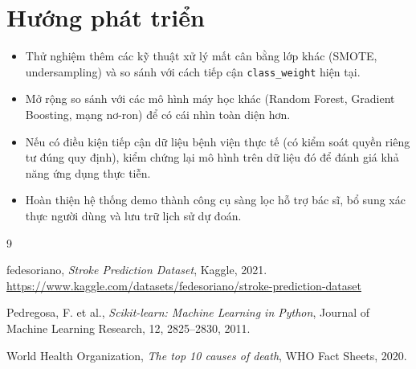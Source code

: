 \documentclass[12pt,a4paper]{report}
\begin{document}
\section{Hướng phát triển}

\begin{itemize}
    \item Thử nghiệm thêm các kỹ thuật xử lý mất cân bằng lớp khác (SMOTE, undersampling) và so sánh với cách tiếp cận \texttt{class\_weight} hiện tại.
    \item Mở rộng so sánh với các mô hình máy học khác (Random Forest, Gradient Boosting, mạng nơ-ron) để có cái nhìn toàn diện hơn.
    \item Nếu có điều kiện tiếp cận dữ liệu bệnh viện thực tế (có kiểm soát quyền riêng tư đúng quy định), kiểm chứng lại mô hình trên dữ liệu đó để đánh giá khả năng ứng dụng thực tiễn.
    \item Hoàn thiện hệ thống demo thành công cụ sàng lọc hỗ trợ bác sĩ, bổ sung xác thực người dùng và lưu trữ lịch sử dự đoán.
\end{itemize}

\begin{thebibliography}{9}

fedesoriano, \emph{Stroke Prediction Dataset}, Kaggle, 2021.
\url{https://www.kaggle.com/datasets/fedesoriano/stroke-prediction-dataset}

Pedregosa, F. et al., \emph{Scikit-learn: Machine Learning in Python}, Journal of Machine Learning Research, 12, 2825--2830, 2011.

World Health Organization, \emph{The top 10 causes of death}, WHO Fact Sheets, 2020.

\end{thebibliography}
\end{document}
